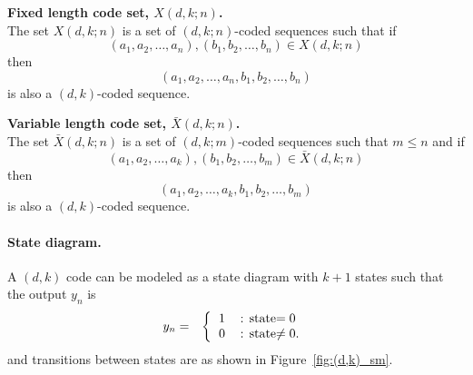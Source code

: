 \begin{definition}{\bf Fixed length code set, $X(d,k;n)$.}\\
The set $X(d,k;n)$ is a set of $(d,k;n)$-coded sequences such that
if
\[ (a_1,a_2,\ldots,a_n),(b_1,b_2,\ldots,b_n)\in X(d,k;n)\]
then
\[ (a_1,a_2,\ldots,a_n,b_1,b_2,\ldots,b_n)\]
is also a $(d,k)$-coded sequence.
\end{definition}

\begin{definition}{\bf Variable length code set, $\bar{X}(d,k;n)$.}\\
The set $\bar{X}(d,k;n)$ is a set of $(d,k;m)$-coded sequences such that
$m\le n$ and if
   \[ (a_1,a_2,\ldots,a_k),(b_1,b_2,\ldots,b_m)\in \bar{X}(d,k;n)\]
then
   \[ (a_1,a_2,\ldots,a_k,b_1,b_2,\ldots,b_m)\]
is also a $(d,k)$-coded sequence.
\end{definition}


\paragraph{State diagram.}
A $(d,k)$ code can be modeled as a state diagram with $k+1$ states
such that the output $y_n$ is
\begin{eqnarray*}
   y_n &=& \left\{
              \begin{tabular}{ll}
                 $1$ & : state$=0$ \\
                 $0$ & : state$\ne 0$.
              \end{tabular}
           \right.
\end{eqnarray*}
and transitions between states are as shown in Figure~\ref{fig:(d,k)_sm}.

